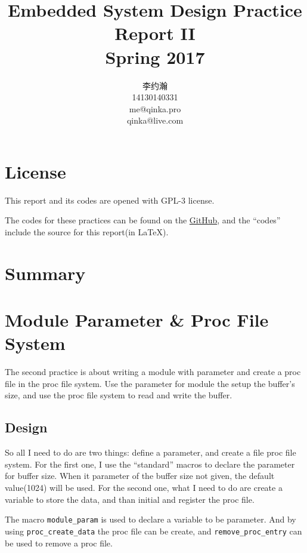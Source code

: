 \documentclass{report}
\title{Embedded System Design Practice Report II \\ Spring 2017}
\author{李约瀚 \\ 14130140331 \\ me@qinka.pro \\ qinka@live.com}
\begin{document}
    \maketitle
    \tableofcontents
    
    \chapter{License}
    \label{chap:license}
    This report and its codes are opened with GPL-3 license.
    
    The codes for these practices can be found on the%
    \href{https://github.com/Qinka/embedded-system-design-homework}{GitHub},
    and the ``codes'' include the source for this report(in \LaTeX).
    
    \chapter{Summary}
    \label{chap:summary}
    
    \chapter{Module Parameter \& Proc File System}
    \label{chap:mpnpsf}
    
    The second practice is about writing a module with parameter and create a proc file in the  proc file system.
    Use the parameter for module the setup the buffer's size, and use the proc file system to read and write the buffer.
    
    \section{Design}
    \label{chap:mpnpsf:design}
    
    So all I need to do are two things:  define a parameter, and create a file proc file system.
    For the first one, I use the ``standard'' macros to declare the parameter for buffer size.
    When it parameter of the buffer size not given, the default value(1024) will be used.
    For the second one, what I need to do are create a variable to store the data, and than initial and register the proc file.
    
    The macro \lstinline|module_param| is used to declare a variable to be parameter.
    And by using \lstinline|proc_create_data| the proc file can be create, and
    \lstinline|remove_proc_entry| can be used to remove a proc file.
    
\end{document}
